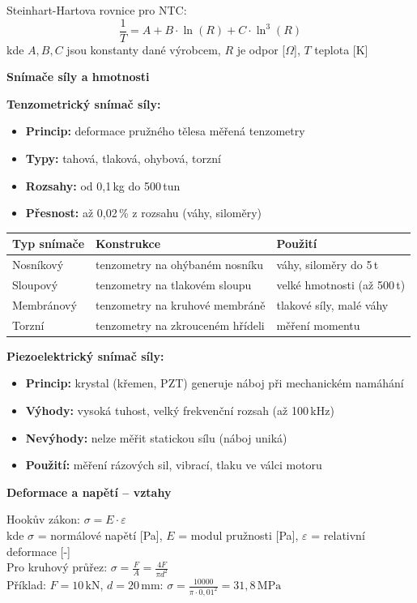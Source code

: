\documentclass[a4paper,10pt]{article}
\begin{document}
\begin{vysvetlenibox}
\begin{vzorcebox}
Steinhart-Hartova rovnice pro NTC:
$$\frac{1}{T} = A + B \cdot \ln(R) + C \cdot \ln^3(R)$$
kde $A, B, C$ jsou konstanty dané výrobcem, $R$ je odpor [$\Omega$], $T$ teplota [K]
\end{vzorcebox}

\textbf{Snímače síly a hmotnosti}

\textbf{Tenzometrický snímač síly:}
\begin{itemize}[noitemsep, leftmargin=1.4em, topsep=4pt]
    \item \textbf{Princip:} deformace pružného tělesa měřená tenzometry
    \item \textbf{Typy:} tahová, tlaková, ohybová, torzní
    \item \textbf{Rozsahy:} od 0,1\,kg do 500\,tun
    \item \textbf{Přesnost:} až 0,02\,\% z rozsahu (váhy, siloměry)
\end{itemize}

\begin{center}
\begin{tabularx}{0.95\linewidth}{@{} l X l @{}}
    \toprule
    \textbf{Typ snímače} & \textbf{Konstrukce} & \textbf{Použití} \\
    \midrule
    Nosníkový & tenzometry na ohýbaném nosníku & váhy, siloměry do 5\,t \\
    Sloupový & tenzometry na tlakovém sloupu & velké hmotnosti (až 500\,t) \\
    Membránový & tenzometry na kruhové membráně & tlakové síly, malé váhy \\
    Torzní & tenzometry na zkrouceném hřídeli & měření momentu \\
    \bottomrule
\end{tabularx}
\end{center}

\textbf{Piezoelektrický snímač síly:}
\begin{itemize}[noitemsep, leftmargin=1.4em, topsep=4pt]
    \item \textbf{Princip:} krystal (křemen, PZT) generuje náboj při mechanickém namáhání
    \item \textbf{Výhody:} vysoká tuhost, velký frekvenční rozsah (až 100\,kHz)
    \item \textbf{Nevýhody:} nelze měřit statickou sílu (náboj uniká)
    \item \textbf{Použití:} měření rázových sil, vibrací, tlaku ve válci motoru
\end{itemize}

\textbf{Deformace a napětí -- vztahy}
\begin{vzorcebox}
Hookův zákon: $\sigma = E \cdot \varepsilon$\\
kde $\sigma$ = normálové napětí [Pa], $E$ = modul pružnosti [Pa],
$\varepsilon$ = relativní deformace [-]\\[6pt]
Pro kruhový průřez: $\sigma = \frac{F}{A} = \frac{4F}{\pi d^2}$\\
Příklad: $F = 10\,\text{kN}$, $d = 20\,\text{mm}$:
$\sigma = \frac{10000}{\pi \cdot 0{,}01^2} = 31{,}8\,\text{MPa}$
\end{vzorcebox}
\end{vysvetlenibox}
\end{document}
